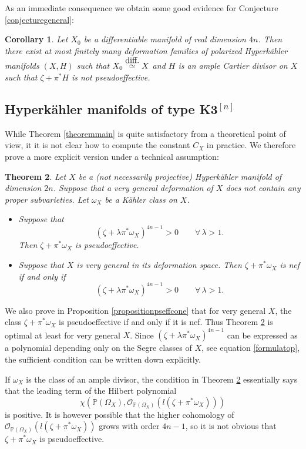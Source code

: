 \documentclass[11pt]{article}
\let\mathcal\mathscr
\theoremstyle{plain}
\newtheorem{theorem}{Theorem}[section]
\newtheorem{corollary}[theorem]{Corollary}
\theoremstyle{definition}
\newcommand{\PP}{\ensuremath{\mathbb{P}}}
\newcommand\sO{{\mathcal O}}
\begin{document}
As an immediate consequence we obtain some good evidence for Conjecture \ref{conjecturegeneral}:

\begin{corollary} \label{corollarygoodevidence}
Let $X_0$ be a differentiable manifold of real dimension $4n$. Then there exist
at most finitely many deformation families of polarized Hyperkähler manifolds $(X, H)$
such that $X_0 \stackrel{\mbox{\tiny diff.}}{\simeq} X$ and $H$ is an ample Cartier divisor on $X$ such that $\zeta + \pi^* H$
is not pseudoeffective.
\end{corollary}

\subsection{Hyperkähler manifolds of type K3$^{[n]}$}

While Theorem \ref{theoremmain} is quite satisfactory from a theoretical point of view, it
it is not clear how to compute the constant $C_X$ in practice. We therefore prove a more explicit version
under a technical assumption:

\begin{theorem}\label{theoremHK}
Let $X$ be a (not necessarily projective) Hyperkähler manifold of dimension $2n$.
Suppose that a very general deformation of $X$ does not contain any proper subvarieties.
Let $\omega_X$ be a Kähler class on $X$.
\begin{itemize}
\item Suppose that
\[
(\zeta + \lambda \pi^* \omega_X)^{4n-1} > 0 \qquad \forall\,\lambda > 1.
\]
Then $\zeta+\pi^*\omega_X$ is pseudoeffective.
\item Suppose that $X$ is very general in its deformation space. Then
$\zeta+\pi^*\omega_X$ is nef if and only if
\[
(\zeta + \lambda \pi^* \omega_X)^{4n-1} > 0 \qquad \forall\,\lambda > 1.
\]
\end{itemize}
\end{theorem}

We also prove in Proposition \ref{propositionpseffcone} that for very general $X$, the class
$\zeta+\pi^*\omega_X$ is pseudoeffective if and only if it is nef. Thus Theorem \ref{theoremHK} is optimal at least
for very general $X$. Since $(\zeta + \lambda \pi^* \omega_X)^{4n-1}$ can be expressed as a polynomial depending only on the Segre classes of $X$, see equation \eqref{formulatop}, the sufficient condition
can be written down explicitly.

If $\omega_X$ is the class of an ample divisor, the condition in
Theorem \ref{theoremHK} essentially says that the leading term of the Hilbert polynomial
\[
\chi(\PP(\Omega_X), \sO_{\PP(\Omega_X)}(l(\zeta + \pi^* \omega_X)))
\]
is positive. It is however possible that the higher cohomology of $\sO_{\PP(\Omega_X)}(l(\zeta + \pi^* \omega_X))$ grows with order $4n-1$, so it is not obvious
that $\zeta + \pi^* \omega_X$ is pseudoeffective.
\end{document}
